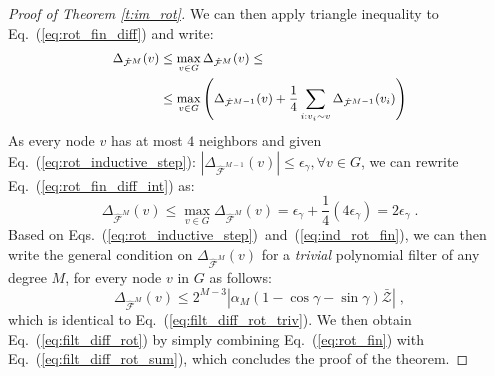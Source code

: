 \documentclass[10pt,journal,compsoc]{IEEEtran}
\newcommand{\renata}[1]{\textcolor{black}{#1}}
\newcommand{\hmF}{\hat{\mathcal{F}}}
\newcommand{\norm}[1]{\left|#1\right|}
\begin{document}
\begin{proof}[Proof of Theorem \ref{t:im_rot}]
		\noindent 
			We can then apply triangle inequality to Eq.~(\ref{eq:rot_fin_diff}) and write:
		\begin{equation}
		\small
		\begin{aligned}
		\Delta_{\hmF^{M}} (v) & \leq \max_{v \in G} \Delta_{\hmF^{M}} (v) \leq \\
		& \leq \max_{v \in G} \left( \Delta_{\hmF^{M-1}}(v) + \frac{1}{4} \sum\limits_{i: v_i \sim v} \Delta_{\hmF^{M-1}} (v_i) \right)
		\end{aligned}
		\label{eq:rot_fin_diff_int}
		\end{equation}
		\noindent
		As every node $v$ has at most $4$ neighbors and given Eq.~({\ref{eq:rot_inductive_step}): $| \Delta_{\hmF^{M-1}} (v) | \leq \epsilon_\gamma, \forall v \in G$, we can rewrite Eq.~(\ref{eq:rot_fin_diff_int}) as}:
		\begin{equation}
		\Delta_{\hmF^{M}}(v) \leq \max_{v \in G} \Delta_{\hmF^{M}} (v) = \epsilon_\gamma + \frac{1}{4}(4 \epsilon_\gamma) = 2\epsilon_\gamma \;.
		\label{eq:ind_rot_fin}
		\end{equation}
		\noindent
		Based on Eqs.~(\ref{eq:rot_inductive_step})~and~(\ref{eq:ind_rot_fin}), we can then write the general condition on $\Delta_{\hmF^{M}}(v)$ for a \emph{trivial} polynomial filter of any degree $M$, for every node $v$ in $G$ as follows:
		\begin{equation}
		\Delta_{\hmF^{M}} (v) \leq 2^{M-3} \norm{\alpha_{M} (1 - \cos \gamma - \sin \gamma) \bar{\mathcal{Z}}} \;, 
		\label{eq:rot_fin}
		\end{equation}
		\noindent
		which is identical to Eq.~(\ref{eq:filt_diff_rot_triv}). We then obtain Eq.~(\ref{eq:filt_diff_rot}) by simply combining Eq.~(\ref{eq:rot_fin}) with Eq.~(\ref{eq:filt_diff_rot_sum}), which concludes the proof of the theorem.
	\end{proof}
	
\end{document}
